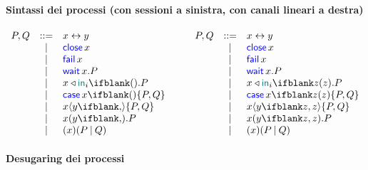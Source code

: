 \documentclass[a4paper]{article}
\title{\Calculus}
\date{}
\begin{document}
\maketitle

\paragraph{Sintassi dei processi (con sessioni a sinistra, con canali lineari a destra)}

\[
    \begin{array}[t]{rcll}
        P, Q & ::= & \Link\x\y \\
            & | & \Close\x \\
            & | & \Fail\x \\
            & | & \Wait\x.P \\
            & | & \Select\x{\InTag_i}{}.P \\
            & | & \Case\x{}{P}{Q} \\
            & | & \Fork\x\y{}{P}{Q} \\
            & | & \Join\x\y{}.P \\
            & | & \Cut\x{P}{Q} \\
    \end{array}
    \qquad
    \begin{array}[t]{rcll}
        P, Q & ::= & \Link\x\y \\
            & | & \Close\x \\
            & | & \Fail\x \\
            & | & \Wait\x.P \\
            & | & \Select\x{\InTag_i}\z.P \\
            & | & \Case\x\z{P}{Q} \\
            & | & \Fork\x\y\z{P}{Q} \\
            & | & \Join\x\y\z.P \\
            & | & \Cut\x{P}{Q} \\
    \end{array}
\]

\paragraph{Desugaring dei processi}
\end{document}
